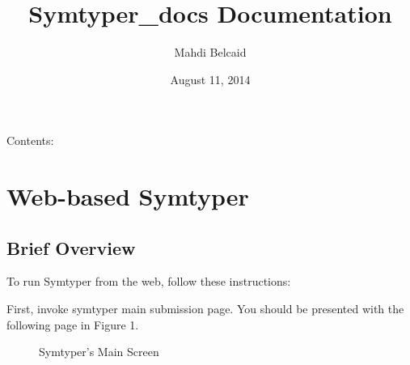 \documentclass[letterpaper,10pt,english]{sphinxmanual}
\title{Symtyper\_docs Documentation}
\date{August 11, 2014}
\author{Mahdi Belcaid}
\begin{document}
\maketitle
\tableofcontents
{}\label{index::doc}


Contents:


\chapter{Web-based Symtyper}
\label{Web::doc}\label{Web:welcome-to-symtyper-s-documentation}\label{Web:web-based-symtyper}

\section{Brief Overview}
\label{Web:brief-overview}
To run Symtyper from the web, follow these instructions:

First, invoke symtyper main submission page. You should be presented with the following page in Figure 1.
\begin{figure}[htbp]
\centering
\capstart

\caption{Symtyper's Main Screen}\end{figure}
\end{document}
